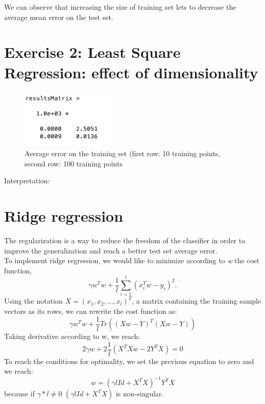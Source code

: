 \documentclass{article} %
\begin{document}
We can observe that increasing the size of training set lets to decrease the average mean error on the test set.

\section{Exercise 2: Least Square Regression: effect of dimensionality}

\begin{figure}[H]
\begin{center}
\includegraphics[width=0.4\textwidth]{resultsMatrix2}
\end{center}
\caption{Average error on the training set (first row: 10 training points, second row: 100 training points}
\end{figure}

Interpretation: 

\section{Ridge regression}

The regularization is a way to reduce the freedom of the classifier in order to improve the generalization and reach a better test set average error. 
\\ To implement ridge regression, we would like to minimize according to \textit{w} the cost function, 
\begin{equation}
\gamma w^{T}w + \frac{1}{l} \sum_{i=1}^{l}(x_{i}^{T}w - y_{i})^{2}.
\end{equation}
Using the notation $X=(x_{1}, x_{2},...,x_{l})^{T}$, a matrix containing the training sample vectors as its rows, we can rewrite the cost function as: 
\begin{equation}
\gamma w^{T} w + \frac{1}{l} Tr((Xw - Y)^{T}(Xw - Y))
\end{equation}
Taking derivative according to w, we reach: 
\begin{equation}
2\gamma w + 2 \frac{1}{l} (X^{T}Xw - 2Y^{T}X)=0
\end{equation}
To reach the conditions for optimality, we set the previous equation to zero and we reach: 
\begin{equation}
w=(\gamma l Id +X^{T}X)^{-1}Y^{T}X
\end{equation}
because if $\gamma*l \ne 0$ $(\gamma l Id +X^{T}X)$ is non-singular.
\end{document}
